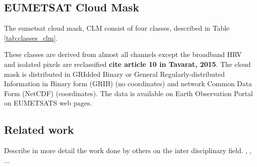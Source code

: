 \subsection{EUMETSAT Cloud Mask} \label{sec:EUMETSAT_cloud_mask}
The \acrshort{eumetsat} cloud mask, CLM consist of four classes, described in Table \ref{tab:classes_clm}.


These classes are derived from almost all channels except the broadband HRV and isolated pixels are reclassified \textbf{cite article 10 in Tavarat, 2015}. The cloud mask is distributed in GRIdded Binary or General Regularly-distributed Information in Binary form (GRIB) (no coordinates) and network Common Data Form (NetCDF) (coordinates). The data is available on Earth Observation Portal on EUMETSATS web pages. 


\subsection{Related work}
Describe in more detail the work done by others on the inter disciplinary field. \cite{SunAirLSTM}, \cite{precip_nowcasting}, \cite{Liu2014DeepForecasting} ...




